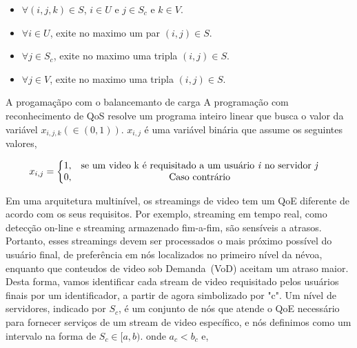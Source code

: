 \begin{itemize}
\item $\forall (i,j,k) \in S$, $i \in U$ e $j \in S_{c}$ e $k \in V$.

\item $\forall i \in U$, exite no maximo um par $(i,j) \in S$.

\item $\forall j \in S_{c}$, exite no maximo uma tripla $(i,j) \in S$.

\item $\forall j \in V$, exite no maximo uma tripla $(i,j) \in S$.
\end{itemize}


%
%
%
 
A progamaçãpo com o balancemanto de carga   
A programação com reconhecimento de QoS resolve um programa inteiro linear que busca o valor da variável $x_{i,j,k} (\in (0, 1))$. $x_{i,j}$ é uma variável binária que assume os seguintes valores,

\vspace{0.5cm}
\begin{equation}\label{total_capacity_loss}
x_{i,j} =
\left\{\begin{matrix}
1, & \text{se um video k é requisitado a um usuário \textit{i} no servidor \textit{j}} & \\ 
0, & \text{Caso contrário} & 
\end{matrix}\right.
\end{equation}
\vspace{0.5cm}

Em uma arquitetura multinível, os streamings de video tem um QoE diferente de acordo com os seus requisitos. Por exemplo, streaming em tempo real, como detecção on-line e streaming armazenado fim-a-fim, são sensíveis a atrasos. Portanto, esses streamings devem ser processados o mais próximo possível do usuário final, de preferência em nós localizados no primeiro nível da névoa, enquanto que conteudos de video sob Demanda~(VoD) aceitam um atraso maior. Desta forma, vamos identificar cada stream de video requisitado pelos usuários finais por um identificador, a partir de agora simbolizado por "c".
Um nível de servidores, indicado por $S_{c}$, é um conjunto de nós que atende o QoE necessário para fornecer serviços de um stream de video específico, e nós definimos como um intervalo na forma de $S_{c} \in [a, b)$. onde $a_{c} < b_{c}$ e,

